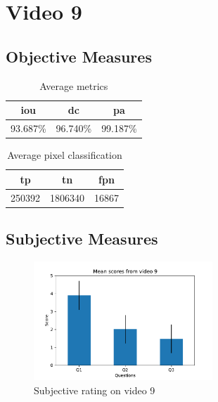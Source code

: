 

\section{Video 9}
\subsection{Objective Measures}

\begin{minipage}[c]{0.475\textwidth}
\begin{table}[H]
    \centering
    \begin{tabular}{||c c c||} 
        \hline
        \acrshort{iou} & \acrshort{dc} & \acrshort{pa} \\ [0.5ex] 
        \hline\hline
        93.687\% & 96.740\% & 99.187\% \\ [1ex] 
        \hline
    \end{tabular}
    \caption{Average metrics}
    \label{tab:metrics_video_9}
\end{table}
\end{minipage}
\begin{minipage}[c]{0.475\textwidth}
\begin{table}[H]
    \centering
    \begin{tabular}{||c c c||} 
        \hline
        \acrshort{tp} & \acrshort{tn} & \acrshort{fpn} \\ [0.5ex] 
        \hline\hline
        250392 & 1806340 & 16867 \\ [1ex] 
        \hline
    \end{tabular}
    \caption{Average pixel classification}
    \label{tab:pixels_video_9}
\end{table}
\end{minipage}

\subsection{Subjective Measures}

\begin{figure}[H]
    \centering
    \includegraphics[width=0.6\textwidth]{img/subjective_measures/analysis/video_9.pdf}
    \caption{Subjective rating on video 9}
    \label{fig:visual_subj_vid9}
\end{figure}

